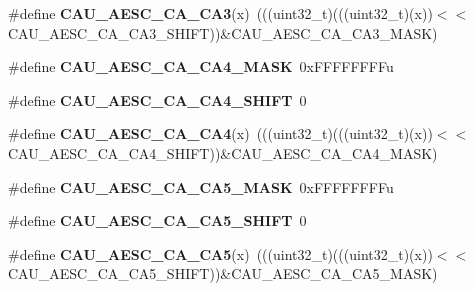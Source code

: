 \begin{DoxyCompactItemize}
\item 
\#define {\bfseries C\+A\+U\+\_\+\+A\+E\+S\+C\+\_\+\+C\+A\+\_\+\+C\+A3}(x)~(((uint32\+\_\+t)(((uint32\+\_\+t)(x))$<$$<$C\+A\+U\+\_\+\+A\+E\+S\+C\+\_\+\+C\+A\+\_\+\+C\+A3\+\_\+\+S\+H\+I\+FT))\&C\+A\+U\+\_\+\+A\+E\+S\+C\+\_\+\+C\+A\+\_\+\+C\+A3\+\_\+\+M\+A\+SK)\hypertarget{group__CAU__Register__Masks_gad446d55254acab1c4ae07a985e549450}{}\label{group__CAU__Register__Masks_gad446d55254acab1c4ae07a985e549450}

\item 
\#define {\bfseries C\+A\+U\+\_\+\+A\+E\+S\+C\+\_\+\+C\+A\+\_\+\+C\+A4\+\_\+\+M\+A\+SK}~0x\+F\+F\+F\+F\+F\+F\+F\+Fu\hypertarget{group__CAU__Register__Masks_ga19b50ba9810cc4a1ebd860aba00dd728}{}\label{group__CAU__Register__Masks_ga19b50ba9810cc4a1ebd860aba00dd728}

\item 
\#define {\bfseries C\+A\+U\+\_\+\+A\+E\+S\+C\+\_\+\+C\+A\+\_\+\+C\+A4\+\_\+\+S\+H\+I\+FT}~0\hypertarget{group__CAU__Register__Masks_ga67414b23056892843c13aaed39303c4d}{}\label{group__CAU__Register__Masks_ga67414b23056892843c13aaed39303c4d}

\item 
\#define {\bfseries C\+A\+U\+\_\+\+A\+E\+S\+C\+\_\+\+C\+A\+\_\+\+C\+A4}(x)~(((uint32\+\_\+t)(((uint32\+\_\+t)(x))$<$$<$C\+A\+U\+\_\+\+A\+E\+S\+C\+\_\+\+C\+A\+\_\+\+C\+A4\+\_\+\+S\+H\+I\+FT))\&C\+A\+U\+\_\+\+A\+E\+S\+C\+\_\+\+C\+A\+\_\+\+C\+A4\+\_\+\+M\+A\+SK)\hypertarget{group__CAU__Register__Masks_ga0f48fe60e6b2d475dbe6c67cd0947f5f}{}\label{group__CAU__Register__Masks_ga0f48fe60e6b2d475dbe6c67cd0947f5f}

\item 
\#define {\bfseries C\+A\+U\+\_\+\+A\+E\+S\+C\+\_\+\+C\+A\+\_\+\+C\+A5\+\_\+\+M\+A\+SK}~0x\+F\+F\+F\+F\+F\+F\+F\+Fu\hypertarget{group__CAU__Register__Masks_ga0368b4a75631ad41f0d262ea1f42f285}{}\label{group__CAU__Register__Masks_ga0368b4a75631ad41f0d262ea1f42f285}

\item 
\#define {\bfseries C\+A\+U\+\_\+\+A\+E\+S\+C\+\_\+\+C\+A\+\_\+\+C\+A5\+\_\+\+S\+H\+I\+FT}~0\hypertarget{group__CAU__Register__Masks_ga4412c36bceb81d934b45def23cb28554}{}\label{group__CAU__Register__Masks_ga4412c36bceb81d934b45def23cb28554}

\item 
\#define {\bfseries C\+A\+U\+\_\+\+A\+E\+S\+C\+\_\+\+C\+A\+\_\+\+C\+A5}(x)~(((uint32\+\_\+t)(((uint32\+\_\+t)(x))$<$$<$C\+A\+U\+\_\+\+A\+E\+S\+C\+\_\+\+C\+A\+\_\+\+C\+A5\+\_\+\+S\+H\+I\+FT))\&C\+A\+U\+\_\+\+A\+E\+S\+C\+\_\+\+C\+A\+\_\+\+C\+A5\+\_\+\+M\+A\+SK)\hypertarget{group__CAU__Register__Masks_gacebcc2eb3e9ab2e135cf3b461fb9956b}{}\label{group__CAU__Register__Masks_gacebcc2eb3e9ab2e135cf3b461fb9956b}


\end{DoxyCompactItemize}
